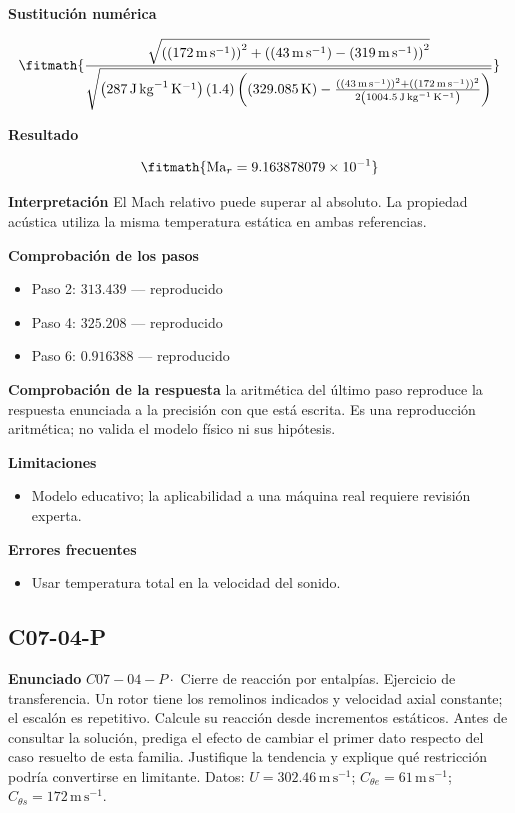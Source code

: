 \documentclass[10pt,openany]{book}
\begin{document}
\noindent\textbf{Sustitución numérica}

\[
\fitmath{\frac{\sqrt{\left(\left(172\,\mathrm{m}\,\mathrm{s}^{-1}\right)\right)^{2} + \left(\left(43\,\mathrm{m}\,\mathrm{s}^{-1}\right) - \left(319\,\mathrm{m}\,\mathrm{s}^{-1}\right)\right)^{2}}}{\sqrt{\left(287\,\mathrm{J}\,\mathrm{kg}^{-1}\,\mathrm{K}^{-1}\right) \left(1.4\right) \left(\left(329.085\,\mathrm{K}\right) - \frac{\left(\left(43\,\mathrm{m}\,\mathrm{s}^{-1}\right)\right)^{2} + \left(\left(172\,\mathrm{m}\,\mathrm{s}^{-1}\right)\right)^{2}}{2 \left(1004.5\,\mathrm{J}\,\mathrm{kg}^{-1}\,\mathrm{K}^{-1}\right)}\right)}}}
\]

\noindent\textbf{Resultado}

\[
\fitmath{\mathrm{Ma}_r=9.163878079\times10^{-1}}
\]

\noindent\textbf{Interpretación}
El Mach relativo puede superar al absoluto. La propiedad acústica utiliza la misma temperatura estática en ambas referencias.

\noindent\textbf{Comprobación de los pasos}
\begin{itemize}
\item Paso 2: $313.439$ — reproducido
\item Paso 4: $325.208$ — reproducido
\item Paso 6: $0.916388$ — reproducido
\end{itemize}

\noindent\textbf{Comprobación de la respuesta} la aritmética del último paso reproduce la respuesta enunciada a la precisión con que está escrita. Es una reproducción aritmética; no valida el modelo físico ni sus hipótesis.

\noindent\textbf{Limitaciones}
\begin{itemize}
\item Modelo educativo; la aplicabilidad a una máquina real requiere revisión experta.
\end{itemize}

\noindent\textbf{Errores frecuentes}
\begin{itemize}
\item Usar temperatura total en la velocidad del sonido.
\end{itemize}
\subsection*{C07-04-P}

\noindent\textbf{Enunciado}
\(C07-04-P \cdot\) Cierre de reacción por entalpías. Ejercicio de transferencia. Un rotor tiene los remolinos indicados y velocidad axial constante; el escalón es repetitivo. Calcule su reacción desde incrementos estáticos. Antes de consultar la solución, prediga el efecto de cambiar el primer dato respecto del caso resuelto de esta familia. Justifique la tendencia y explique qué restricción podría convertirse en limitante. Datos: \(U=302.46\, \mathrm{m}\,\mathrm{s}^{-1}\); \(C_{\theta e}=61\, \mathrm{m}\,\mathrm{s}^{-1}\); \(C_{\theta s}=172\, \mathrm{m}\,\mathrm{s}^{-1}\).
\end{document}
